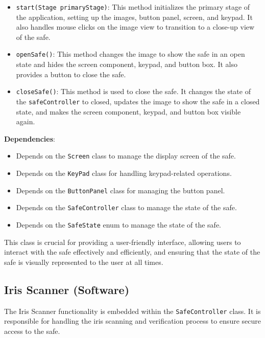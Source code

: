 \documentclass{article}
\begin{document}
\begin{itemize}
    \item \texttt{start(Stage primaryStage)}: This method initializes the primary stage of the application, setting up the images, button panel, screen, and keypad. It also handles mouse clicks on the image view to transition to a close-up view of the safe.
    \item \texttt{openSafe()}: This method changes the image to show the safe in an open state and hides the screen component, keypad, and button box. It also provides a button to close the safe.
    \item \texttt{closeSafe()}: This method is used to close the safe. It changes the state of the \texttt{safeController} to closed, updates the image to show the safe in a closed state, and makes the screen component, keypad, and button box visible again.
\end{itemize}
\textbf{Dependencies}:
\begin{itemize}
    \item Depends on the \texttt{Screen} class to manage the display screen of the safe.
    \item Depends on the \texttt{KeyPad} class for handling keypad-related operations.
    \item Depends on the \texttt{ButtonPanel} class for managing the button panel.
    \item Depends on the \texttt{SafeController} class to manage the state of the safe.
    \item Depends on the \texttt{SafeState} enum to manage the state of the safe.
\end{itemize}
This class is crucial for providing a user-friendly interface, allowing users to interact with the safe effectively and efficiently, and ensuring that the state of the safe is visually represented to the user at all times.

\subsection{Iris Scanner (Software)}
The Iris Scanner functionality is embedded within the \texttt{SafeController} class. It is responsible for handling the iris scanning and verification process to ensure secure access to the safe.
\end{document}
